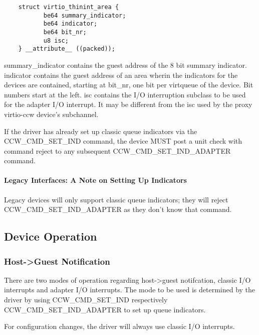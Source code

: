 \begin{lstlisting}
	struct virtio_thinint_area {
	       be64 summary_indicator;
	       be64 indicator;
	       be64 bit_nr;
	       u8 isc;
	} __attribute__ ((packed));
\end{lstlisting}

summary_indicator contains the guest address of the 8 bit summary
indicator.
indicator contains the guest address of an area wherin the indicators
for the devices are contained, starting at bit_nr, one bit per
virtqueue of the device. Bit numbers start at the left.
isc contains the I/O interruption subclass to be used for the adapter
I/O interrupt. It may be different from the isc used by the proxy
virtio-ccw device's subchannel.

If the driver has already set up classic queue indicators via the
CCW_CMD_SET_IND command, the device MUST post a unit check with
command reject to any subsequent CCW_CMD_SET_IND_ADAPTER command.

\paragraph{Legacy Interfaces: A Note on Setting Up Indicators}\label{sec:Virtio Transport Options / Virtio over channel I/O / Device Initialization / Setting Up Indicators / Legacy Interfaces: A Note on Setting Up Indicators}

Legacy devices will only support classic queue indicators; they will
reject CCW_CMD_SET_IND_ADAPTER as they don't know that command.

\subsection{Device Operation}\label{sec:Virtio Transport Options / Virtio over channel I/O / Device Operation}

\subsubsection{Host->Guest Notification}\label{sec:Virtio Transport Options / Virtio over channel I/O / Device Operation / Host->Guest Notification}

There are two modes of operation regarding host->guest notifcation,
classic I/O interrupts and adapter I/O interrupts. The mode to be
used is determined by the driver by using CCW_CMD_SET_IND respectively
CCW_CMD_SET_IND_ADAPTER to set up queue indicators.

For configuration changes, the driver will always use classic I/O
interrupts.

